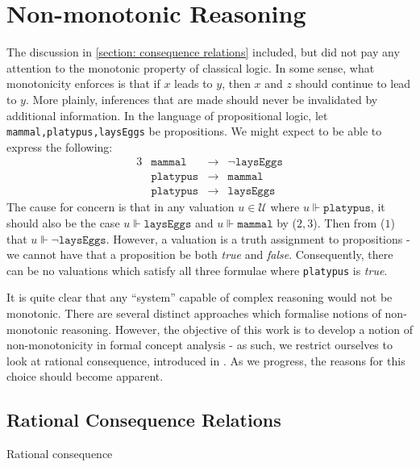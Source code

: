 \section{Non-monotonic Reasoning}
\label{section—nmr}
The discussion in \autoref{section: consequence relations} included, but did not pay any attention to the monotonic property of classical logic. In some sense, what monotonicity enforces is that if $x$ leads to $y$, then $x$ and $z$ should continue to lead to $y$. More plainly, inferences that are made should never be invalidated by additional information. \cite{Kaliski:2020,Pearl:1990} In the language of propositional logic, let \texttt{mammal,platypus,laysEggs} be propositions. We might expect to be able to express the following:
\begin{alignat}{3}
     & \texttt{mammal}   & {} \rightarrow{} & {} \neg \texttt{laysEggs} \\
     & \texttt{platypus} & {} \rightarrow{} & {} \texttt{mammal}        \\
     & \texttt{platypus} & {} \rightarrow{} & {} \texttt{laysEggs}
\end{alignat}
%
The cause for concern is that in any valuation $u \in \mathcal{U}$ where $u \Vdash \texttt{platypus}$, it should also be the case $u \Vdash \texttt{laysEggs}$ and $u \Vdash \texttt{mammal}$ by ($2,3$). Then from ($1$) that $u \Vdash \neg\texttt{laysEggs}$. However, a valuation is a truth assignment to propositions - we cannot have that a proposition be both \emph{true} and \emph{false}. Consequently, there can be no valuations which satisfy all three formulae where \texttt{platypus} is \emph{true}.

It is quite clear that any ``system'' capable of complex reasoning would not be monotonic. There are several distinct approaches which formalise notions of non-monotonic reasoning. However, the objective of this work is to develop a notion of non-monotonicity in formal concept analysis - as such, we restrict ourselves to look at rational consequence, introduced in \cite{Kaliski:2020,lehmann:2002,Pearl:1990}. As we progress, the reasons for this choice should become apparent.

\subsection{Rational Consequence Relations}
\label{subsection: preferential reasoning}

Rational consequence